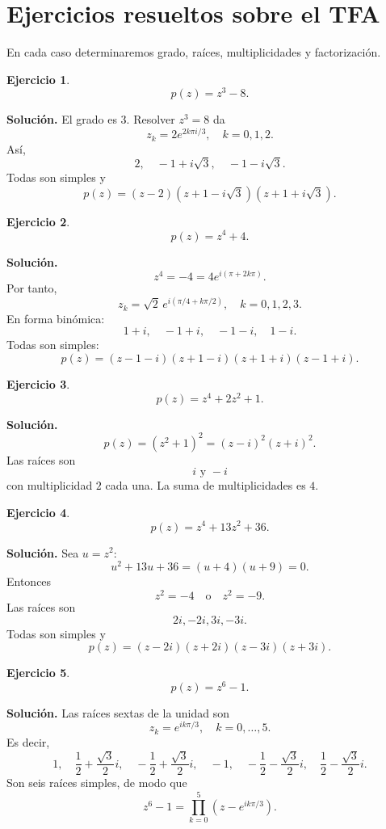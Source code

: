 \documentclass[12pt]{article}
\theoremstyle{definition}
\newtheorem{ejercicio}{Ejercicio}[section]
\theoremstyle{remark}
\begin{document}
\section{Ejercicios resueltos sobre el TFA}

En cada caso determinaremos grado, raíces, multiplicidades y factorización.

\begin{ejercicio}
\[
p(z)=z^3-8.
\]
\end{ejercicio}

\textbf{Solución.}
El grado es $3$. Resolver $z^3=8$ da
\[
z_k=2e^{2k\pi i/3},\quad k=0,1,2.
\]
Así,
\[
2,\quad -1+i\sqrt3,\quad -1-i\sqrt3.
\]
Todas son simples y
\[
\boxed{
p(z)=(z-2)(z+1-i\sqrt3)(z+1+i\sqrt3).
}
\]

\begin{ejercicio}
\[
p(z)=z^4+4.
\]
\end{ejercicio}

\textbf{Solución.}
\[
z^4=-4=4e^{i(\pi+2k\pi)}.
\]
Por tanto,
\[
z_k=\sqrt2\,e^{i(\pi/4+k\pi/2)},\quad k=0,1,2,3.
\]
En forma binómica:
\[
1+i,\quad -1+i,\quad -1-i,\quad 1-i.
\]
Todas son simples:
\[
\boxed{
p(z)=(z-1-i)(z+1-i)(z+1+i)(z-1+i).
}
\]

\begin{ejercicio}
\[
p(z)=z^4+2z^2+1.
\]
\end{ejercicio}

\textbf{Solución.}
\[
p(z)=(z^2+1)^2=(z-i)^2(z+i)^2.
\]
Las raíces son
\[
\boxed{i\text{ y }-i}
\]
con multiplicidad $2$ cada una. La suma de multiplicidades es $4$.

\begin{ejercicio}
\[
p(z)=z^4+13z^2+36.
\]
\end{ejercicio}

\textbf{Solución.}
Sea $u=z^2$:
\[
u^2+13u+36=(u+4)(u+9)=0.
\]
Entonces
\[
z^2=-4\quad\text{o}\quad z^2=-9.
\]
Las raíces son
\[
\boxed{2i,-2i,3i,-3i}.
\]
Todas son simples y
\[
\boxed{
p(z)=(z-2i)(z+2i)(z-3i)(z+3i).
}
\]

\begin{ejercicio}
\[
p(z)=z^6-1.
\]
\end{ejercicio}

\textbf{Solución.}
Las raíces sextas de la unidad son
\[
z_k=e^{ik\pi/3},\quad k=0,\ldots,5.
\]
Es decir,
\[
1,\quad
\frac12+\frac{\sqrt3}{2}i,\quad
-\frac12+\frac{\sqrt3}{2}i,\quad
-1,\quad
-\frac12-\frac{\sqrt3}{2}i,\quad
\frac12-\frac{\sqrt3}{2}i.
\]
Son seis raíces simples, de modo que
\[
\boxed{
z^6-1=\prod_{k=0}^{5}(z-e^{ik\pi/3}).
}
\]
\end{document}
